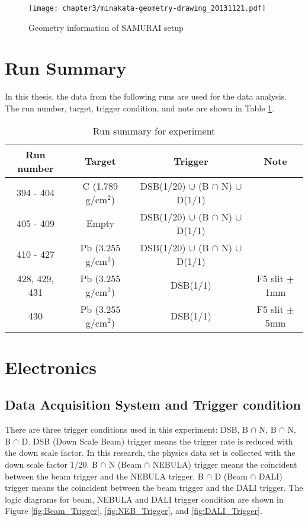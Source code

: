 \begin{figure}
    \centering
    \texttt{[image: chapter3/minakata-geometry-drawing\_20131121.pdf]}
    \caption{Geometry information of SAMURAI setup \cite{Dayonewiki}}
    \label{fig:Geometry}
\end{figure}

\clearpage

\section{Run Summary}
In this thesis, the data from the following runs are used for the data analysis. The run number, target, trigger condition, and note are shown in Table \ref{tab:Run_Summary}.

\begin{table}[h]
    \centering
    \begin{tabular}[h]{c|ccc}
        \hline
        Run number& Target & Trigger & Note\\
        \hline
        394 - 404 &  C (1.789 g/cm${}^{2}$)  & DSB(1/20) $\cup$  (B $\cap$ N) $\cup$ D(1/1) &\\
        405 - 409 &  Empty  & DSB(1/20) $\cup$ (B $\cap$ N) $\cup$ D(1/1) &\\
        410 - 427 &  Pb (3.255 g/cm${}^{2}$)  & DSB(1/20) $\cup$ (B $\cap$ N) $\cup$ D(1/1) &\\
        428, 429, 431 & Pb (3.255 g/cm${}^{2}$)  & DSB(1/1) & F5 slit $\pm$1mm \\
        430 & Pb (3.255 g/cm${}^{2}$)  & DSB(1/1) & F5 slit $\pm$5mm \\
        \hline
    \end{tabular}
    \caption{Run summary for experiment\cite{Dayonewiki}}
    \label{tab:Run_Summary}
\end{table}

\section{Electronics}
\subsection{Data Acquisition System and Trigger condition}
There are three trigger conditions used in this experiment: DSB, B $\cap$ N, B $\cap$ N, B $\cap$ D. DSB (Down Scale Beam) trigger means the trigger rate is reduced with the down scale factor. In this research, the physics data set is collected with the down scale factor 1/20. B $\cap$ N (Beam $\cap$ NEBULA) trigger means the coincident between the beam trigger and the NEBULA trigger. B $\cap$ D (Beam $\cap$ DALI) trigger means the coincident between the beam trigger and the DALI trigger. The logic diagrams for beam, NEBULA and DALI trigger condition are shown in Figure \ref{fig:Beam_Trigger}, \ref{fig:NEB_Trigger}, and \ref{fig:DALI_Trigger}. 

